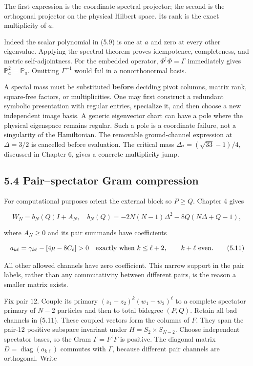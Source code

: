 \documentclass[a4paper,11pt]{article}
\numberwithin{equation}{section}
\begin{document}
The first expression is the coordinate spectral projector; the second is the orthogonal projector on the physical Hilbert space. Its rank is the exact multiplicity of \(a\).

Indeed the scalar polynomial in (5.9) is one at \(a\) and zero at every other eigenvalue. Applying the spectral theorem proves idempotence, completeness, and metric self-adjointness. For the embedded operator, \(\Phi^\dagger\Phi=\Gamma\) immediately gives \(\mathbb P_a^2=\mathbb P_a\). Omitting \(\Gamma^{-1}\) would fail in a nonorthonormal basis.

A special mass must be substituted \textbf{before} deciding pivot columns, matrix rank, square-free factors, or multiplicities. One may first construct a redundant symbolic presentation with regular entries, specialize it, and then choose a new independent image basis. A generic eigenvector chart can have a pole where the physical eigenspace remains regular. Such a pole is a coordinate failure, not a singularity of the Hamiltonian. The removable ground-channel expression at \(\Delta=3/2\) is cancelled before evaluation. The critical mass \(\Delta_*=(\sqrt{33}-1)/4\), discussed in Chapter 6, gives a concrete multiplicity jump.

\hypertarget{pairspectator-gram-compression}{%
\subsection{5.4 Pair--spectator Gram compression}\label{pairspectator-gram-compression}}

For computational purposes orient the external block so \(P\ge Q\). Chapter 4 gives

\[
W_N=b_N(Q)I+A_N,\quad
b_N(Q)=-2N(N-1)\Delta^2-8Q(N\Delta+Q-1),
\tag{5.10}
\]

where \(A_N\ge0\) and its pair summands have coefficients

\[
a_{k\ell}=\gamma_{k\ell}-[4\mu-8C_\ell]>0
\quad\hbox{exactly when }k\le\ell+2,
\qquad k+\ell\text{ even}.
\tag{5.11}
\]

All other allowed channels have zero coefficient. This narrow support in the pair labels, rather than any commutativity between different pairs, is the reason a smaller matrix exists.

Fix pair \(12\). Couple its primary \((z_1-z_2)^k(w_1-w_2)^\ell\) to a complete spectator primary of \(N-2\) particles and then to total bidegree \((P,Q)\). Retain all bad channels in (5.11). These coupled vectors form the columns of \(F\). They span the pair-\(12\) positive subspace invariant under \(H=S_2\times S_{N-2}\). Choose independent spectator bases, so the Gram \(\Gamma=F^\dagger F\) is positive. The diagonal matrix \(D=\operatorname{diag}(a_{k\ell})\) commutes with \(\Gamma\), because different pair channels are orthogonal. Write
\end{document}
